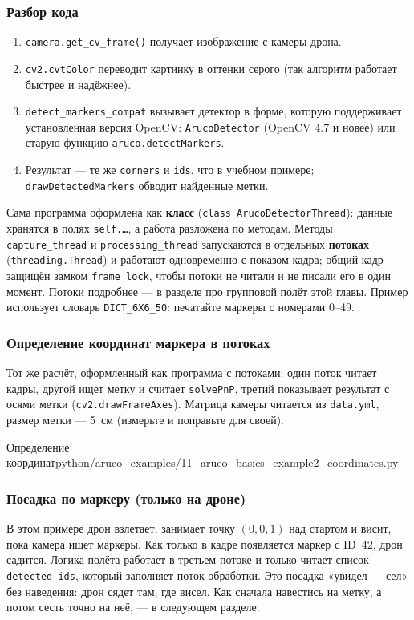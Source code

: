 \subsubsection*{Разбор кода}
\begin{enumerate}
    \item \texttt{camera.get\_cv\_frame()} получает изображение с камеры дрона.
    \item \texttt{cv2.cvtColor} переводит картинку в оттенки серого (так алгоритм работает быстрее и надёжнее).
    \item \texttt{detect\_markers\_compat} вызывает детектор в форме, которую поддерживает установленная версия OpenCV: \texttt{ArucoDetector} (OpenCV 4.7 и новее) или старую функцию \texttt{aruco.detectMarkers}.
    \item Результат --- те же \texttt{corners} и \texttt{ids}, что в учебном примере; \texttt{drawDetectedMarkers} обводит найденные метки.
\end{enumerate}

Сама программа оформлена как \textbf{класс} (\texttt{class ArucoDetectorThread}): данные хранятся в полях \texttt{self.\dots}, а работа разложена по методам. Методы \texttt{capture\_thread} и \texttt{processing\_thread} запускаются в отдельных \textbf{потоках} (\texttt{threading.Thread}) и работают одновременно с показом кадра; общий кадр защищён замком \texttt{frame\_lock}, чтобы потоки не читали и не писали его в один момент. Потоки подробнее --- в разделе про групповой полёт этой главы. Пример использует словарь \texttt{DICT\_6X6\_50}: печатайте маркеры с номерами 0--49.

\subsubsection*{Определение координат маркера в потоках}
Тот же расчёт, оформленный как программа с потоками: один поток читает кадры, другой ищет метку и считает \verb|solvePnP|, третий показывает результат с осями метки (\verb|cv2.drawFrameAxes|). Матрица камеры читается из \texttt{data.yml}, размер метки --- 5~см (измерьте и поправьте для своей).

\begin{codefiletitle}[python]{Определение координат}{python/aruco_examples/11_aruco_basics_example2_coordinates.py}
\end{codefiletitle}

\subsubsection*{Посадка по маркеру (только на дроне)}
В этом примере дрон взлетает, занимает точку $(0, 0, 1)$ над стартом и висит, пока камера ищет маркеры. Как только в кадре появляется маркер с ID~42, дрон садится. Логика полёта работает в третьем потоке и только читает список \texttt{detected\_ids}, который заполняет поток обработки. Это посадка «увидел --- сел» без наведения: дрон сядет там, где висел. Как сначала навестись на метку, а потом сесть точно на неё, --- в следующем разделе.

